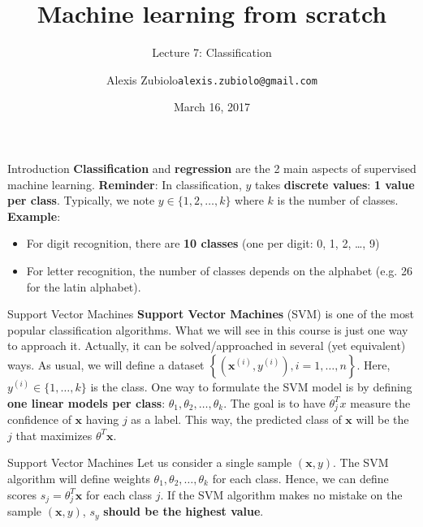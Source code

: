 \documentclass{beamer}
\title{Machine learning from scratch}
\subtitle{Lecture 7: Classification}
\author{Alexis Zubiolo\newline\texttt{alexis.zubiolo@gmail.com}}
\institute{Data Science Team Lead @ Adcash}
\date{March 16, 2017}
\newcommand{\1}[1]{\mathbbm{1}\left[#1\right]}
\newcommand{\yi}{y^{(i)}}
\newcommand{\bx}{\bm{x}}
\newcommand{\bxi}{\bx^{(i)}}
\newcommand{\pv}{\pause\vfill}
\begin{document}
\begin{frame}
  \titlepage
\end{frame}

\begin{frame}{Introduction}
\textbf{Classification} and \textbf{regression} are the 2 main aspects of supervised machine learning.
\pv
\textbf{Reminder}: In classification, $y$ takes \textbf{discrete values}: \textbf{1 value per class}. Typically, we note $y \in \{1, 2, \dots, k \}$ where $k$ is the number of classes.
\pv
\textbf{Example}: 
\begin{itemize}
	\item For digit recognition, there are \textbf{10 classes} (one per digit: 0, 1, 2, \ldots, 9)
	\item For letter recognition, the number of classes depends on the alphabet (e.g. 26 for the latin alphabet).
\end{itemize}
\end{frame}

\begin{frame}{Support Vector Machines}
\textbf{Support Vector Machines} (SVM) is one of the most popular classification algorithms. What we will see in this course is just one way to approach it. Actually, it can be solved/approached in several (yet equivalent) ways.
\pv
As usual, we will define a dataset $\left\{ (\bxi, \yi), i =1, \dots, n\right\}$. Here, $\yi \in \{ 1, \dots, k\}$ is the class.
\pv
One way to formulate the SVM model is by defining \textbf{one linear models per class}: $\theta_1, \theta_2, \dots, \theta_k$. The goal is to have $\theta_j^T x$ measure the confidence of $\bx$ having $j$ as a label. This way, the predicted class of $\bx$ will be the $j$ that maximizes $\theta^T \bx$.
\end{frame}

\begin{frame}{Support Vector Machines}
Let us consider a single sample $(\bx, y)$. The SVM algorithm will define weights $\theta_1, \theta_2, \dots, \theta_k$ for each class.
\pv
Hence, we can define scores $s_j = \theta_j^T \bx$ for each class $j$. If the SVM algorithm makes no mistake on the sample $(\bx, y)$, $s_y$ \textbf{should be the highest value}.
\end{frame}
\end{document}
